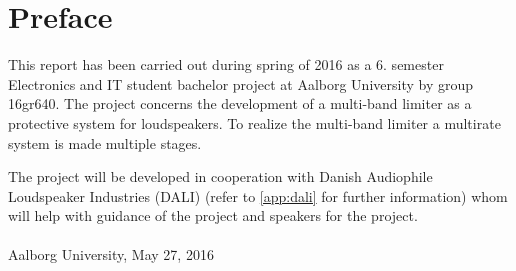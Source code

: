 \chapter*{Preface}\label{ch:forord}%
This report has been carried out during spring of 2016 as a 6. semester Electronics and IT student bachelor project at Aalborg University by group 16gr640. The project concerns the development of a multi-band limiter as a protective system for loudspeakers. To realize the multi-band limiter a multirate system is made multiple stages.

The project will be developed in cooperation with Danish Audiophile Loudspeaker Industries (DALI) (refer to \autoref{app:dali} for further information) whom will help with guidance of the project and speakers for the project.   
\\\\

\vspace{0.5\baselineskip}\hfill Aalborg University, May 27, 2016

